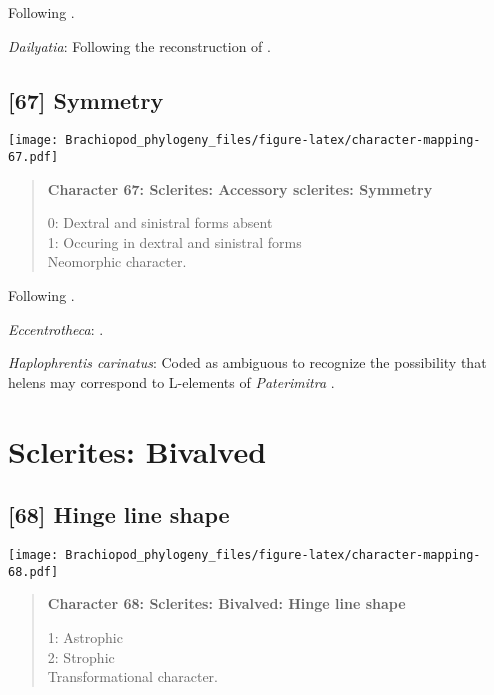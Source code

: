 \documentclass[openany]{book}
\theoremstyle{definition}
\theoremstyle{definition}
\theoremstyle{definition}
\theoremstyle{remark}
\begin{document}
Following \citet{Zhao2017}.

\hypertarget{Dailyatia-coding-66}{}
\emph{Dailyatia}: Following the reconstruction of
\citet{Skovsted2015Theearly}.

\subsection*{{[}67{]} Symmetry}\label{symmetry}

\texttt{[image: Brachiopod\_phylogeny\_files/figure-latex/character-mapping-67.pdf]}

\begin{quote}
\textbf{Character 67: Sclerites: Accessory sclerites: Symmetry}

0: Dextral and sinistral forms absent\\
1: Occuring in dextral and sinistral forms\\
Neomorphic character.
\end{quote}

Following \citet{Zhao2017}.

\hypertarget{Eccentrotheca-coding-67}{}
\emph{Eccentrotheca}: \citet{Skovsted2008Thescleritome}.

\hypertarget{Haplophrentis_carinatus-coding-67}{}
\emph{Haplophrentis carinatus}: Coded as ambiguous to recognize the
possibility that helens may correspond to L-elements of
\emph{Paterimitra} \citep{Moysiuk2017Hyolithsare}.

\section{Sclerites: Bivalved}\label{sclerites-bivalved}

\subsection*{{[}68{]} Hinge line shape}\label{hinge-line-shape}

\texttt{[image: Brachiopod\_phylogeny\_files/figure-latex/character-mapping-68.pdf]}

\begin{quote}
\textbf{Character 68: Sclerites: Bivalved: Hinge line shape}

1: Astrophic\\
2: Strophic\\
Transformational character.
\end{quote}
\end{document}
